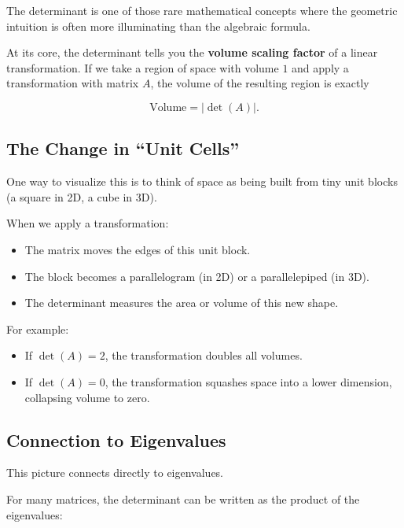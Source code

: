 \documentclass[11pt,openany]{book}
\theoremstyle{definition}
\begin{document}
The determinant is one of those rare mathematical concepts where the geometric intuition is often more illuminating than the algebraic formula.

\medskip

At its core, the determinant tells you the \textbf{volume scaling factor} of a linear transformation. 
If we take a region of space with volume $1$ and apply a transformation with matrix $A$, 
the volume of the resulting region is exactly

\[
\text{Volume} = |\det(A)|.
\]

\medskip

\subsection{The Change in ``Unit Cells''}

One way to visualize this is to think of space as being built from tiny unit blocks 
(a square in 2D, a cube in 3D).

\medskip

When we apply a transformation:

\begin{itemize}
  \item The matrix moves the edges of this unit block.
  \item The block becomes a parallelogram (in 2D) or a parallelepiped (in 3D).
  \item The determinant measures the area or volume of this new shape.
\end{itemize}

\medskip

For example:

\begin{itemize}
  \item If $\det(A) = 2$, the transformation doubles all volumes.
  \item If $\det(A) = 0$, the transformation squashes space into a lower dimension, 
  collapsing volume to zero.
\end{itemize}

\medskip

\subsection{Connection to Eigenvalues}

This picture connects directly to eigenvalues.

\medskip

For many matrices, the determinant can be written as the product of the eigenvalues:
\end{document}
